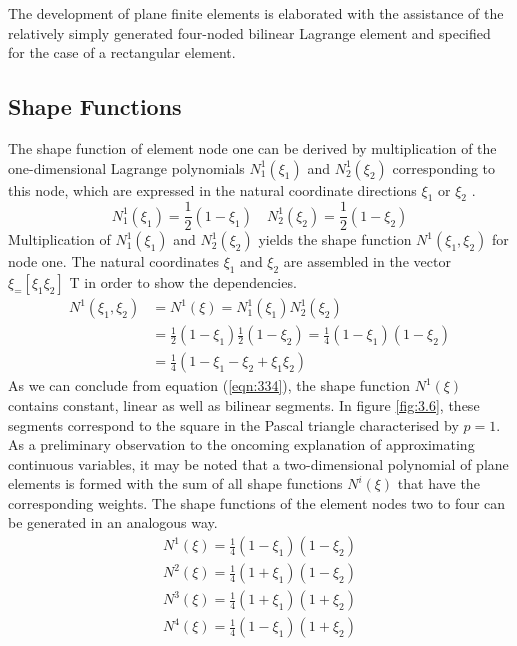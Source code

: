 The development of plane finite elements is elaborated with the assistance of the relatively simply
generated four-noded bilinear Lagrange element and specified for the case of a rectangular
element.
\subsection{Shape Functions}
The shape function of element node one can be derived by multiplication of the one-dimensional
Lagrange polynomials $N_1^1 (\xi_1 )$ and $N_2^1 (\xi_2 )$ corresponding to this node, which are expressed
in the natural coordinate directions $\xi_1$ or $ \xi_2$ .
\begin{equation}
\label{eqn:3.33}
 N_{1}^{1}\left(\xi_{1}\right)=\frac{1}{2}\left(1-\xi_{1}\right) \quad N_{2}^{1}\left(\xi_{2}\right)=\frac{1}{2}\left(1-\xi_{2}\right) 
\end{equation}
Multiplication of $N_1^1(\xi_1)$ and $N_2^1(\xi_2)$ yields the shape function $N^1(\xi_ 1 , \xi_ 2 )$ for node one. The natural coordinates $\xi_ 1$ and $\xi_ 2$ are assembled in the vector $\xi_ = [\xi_ 1 \xi_ 2 ]$ T in order to show the dependencies.
\begin{equation}
\label{eqn:3.34}
    \label{eqn:334}
    \begin{split}
        {N^1}\left( {{\xi _1},{\xi _2}} \right) &= {N^1}(\xi ) = N_1^1\left( {{\xi _1}} \right)N_2^1\left( {{\xi _2}} \right) \\ &= \frac{1}{2}\left( {1 - {\xi _1}} \right)\frac{1}{2}\left( {1 - {\xi _2}} \right) = \frac{1}{4}\left( {1 - {\xi _1}} \right)\left( {1 - {\xi _2}} \right) \\ &= \frac{1}{4}\left( {1 - {\xi _1} - {\xi _2} + {\xi _1}{\xi _2}} \right)
    \end{split}
\end{equation}
As we can conclude from equation (\ref{eqn:334}), the shape function $N^1(\xi)$ contains constant, linear as
well as bilinear segments. In figure \ref{fig:3.6}, these segments correspond to the square in the Pascal
triangle characterised by $p = 1$. As a preliminary observation to the oncoming explanation of
approximating continuous variables, it may be noted that a two-dimensional polynomial of
plane elements is formed with the sum of all shape functions $N^i(\xi)$ that have the corresponding
weights. The shape functions of the element nodes two to four can be generated in an analogous way.
\begin{equation}
\label{eqn:3.35}
    \begin{gathered}
{N^1}(\xi ) = \frac{1}{4}\left( {1 - {\xi _1}} \right)\left( {1 - {\xi _2}} \right)\\
{N^2}(\xi ) = \frac{1}{4}\left( {1 + {\xi _1}} \right)\left( {1 - {\xi _2}} \right)\\
{N^3}(\xi ) = \frac{1}{4}\left( {1 + {\xi _1}} \right)\left( {1 + {\xi _2}} \right)\\
{N^4}(\xi ) = \frac{1}{4}\left( {1 - {\xi _1}} \right)\left( {1 + {\xi _2}} \right)
\end{gathered}
\end{equation}

